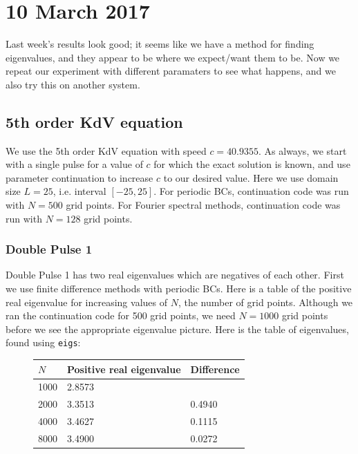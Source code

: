 \documentclass[12pt]{article}
\begin{document}
\section*{10 March 2017}
Last week's results look good; it seems like we have a method for finding eigenvalues, and they appear to be where we expect/want them to be. Now we repeat our experiment with different paramaters to see what happens, and we also try this on another system.

\subsection*{5th order KdV equation}
We use the 5th order KdV equation with speed $c = 40.9355$. As always, we start with a single pulse for a value of $c$ for which the exact solution is known, and use parameter continuation to increase $c$ to our desired value. Here we use domain size $L = 25$, i.e. interval $[-25, 25]$. For periodic BCs, continuation code was run with $N = 500$ grid points. For Fourier spectral methods, continuation code was run with $N = 128$ grid points.

\subsubsection*{Double Pulse 1}
Double Pulse 1 has two real eigenvalues which are negatives of each other. First we use finite difference methods with periodic BCs. Here is a table of the positive real eigenvalue for increasing values of $N$, the number of grid points. Although we ran the continuation code for 500 grid points, we need $N = 1000$ grid points before we see the appropriate eigenvalue picture. Here is the table of eigenvalues, found using \texttt{eigs}:
\begin{figure}[H]
\begin{tabular}{l|ll}
$N$    & Positive real eigenvalue      &  Difference      \\ \hline
  1000 &       2.8573  &             \\ 
  2000 &       3.3513  &      0.4940 \\ 
  4000 &       3.4627  &      0.1115 \\ 
  8000 &       3.4900  &      0.0272 \\ 
\end{tabular}
\end{figure}
\end{document}

